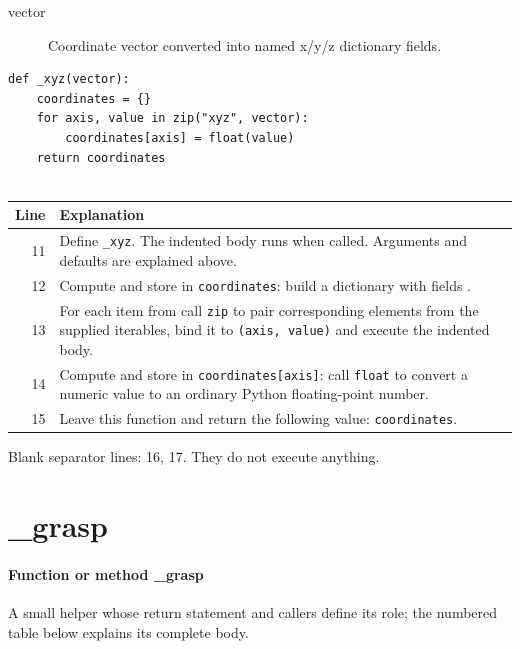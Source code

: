 \documentclass[11pt,a4paper]{book}
\begin{document}
\begin{description}
\item[vector] Coordinate vector converted into named x/y/z dictionary fields.
\end{description}

\begin{lstlisting}[firstnumber=11]
def _xyz(vector):
    coordinates = {}
    for axis, value in zip("xyz", vector):
        coordinates[axis] = float(value)
    return coordinates


\end{lstlisting}

\begin{longtable}{r p{}}

\textbf{Line} & \textbf{Explanation} \\ \hline \endhead

11 & Define \texttt{\_xyz}. The indented body runs when called. Arguments and defaults are explained above. \\

12 & Compute and store in \texttt{coordinates}: build a dictionary with fields \texttt{}.  \\

13 & For each item from call \texttt{zip} to pair corresponding elements from the supplied iterables, bind it to \texttt{(axis, value)} and execute the indented body. \\

14 & Compute and store in \texttt{coordinates[axis]}: call \texttt{float} to convert a numeric value to an ordinary Python floating-point number.  \\

15 & Leave this function and return the following value: \texttt{coordinates}. \\

\end{longtable}

Blank separator lines: 16, 17. They do not execute anything.

\section{\_grasp}

\paragraph{Function or method \_grasp}
A small helper whose return statement and callers define its role; the numbered table below explains its complete body.
\end{document}
